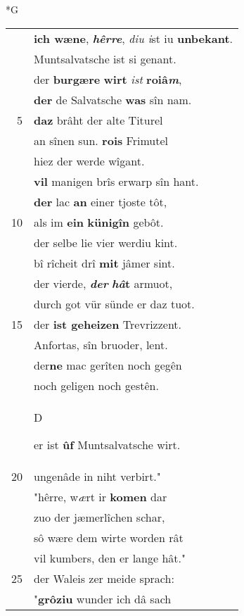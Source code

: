\documentclass[8pt,a4paper,notitlepage]{article}
\begin{document}
\newpage
\begin{table}[ht]
\begin{minipage}[t]{0.5\linewidth}
\small
\begin{center}*G
\end{center}
\begin{tabular}{rl}
 & \textbf{ich wæne}, \textit{\textbf{hêrre}}, \textit{diu i}st iu \textbf{unbekant}.\\ 
 & Muntsalvatsche ist si genant.\\ 
 & der \textbf{burgære} \textbf{wirt} \textit{ist} \textbf{roiâ\textit{m}},\\ 
 & \textbf{der} de Salvatsche \textbf{was} sîn nam.\\ 
5 & \textbf{daz} brâht der alte Titurel\\ 
 & an sînen sun. \textbf{rois} Frimutel\\ 
 & hiez der werde wîgant.\\ 
 & \textbf{vil} manigen brîs erwarp sîn hant.\\ 
 & \textbf{der} lac \textbf{an} einer tjoste tôt,\\ 
10 & als im \textbf{ein} \textbf{künigîn} gebôt.\\ 
 & der selbe lie vier werdiu kint.\\ 
 & bî rîcheit drî \textbf{mit} jâmer sint.\\ 
 & der vierde, \textit{\textbf{der}} \textbf{\textit{hâ}t} armuot,\\ 
 & durch got vür sünde er daz tuot.\\ 
15 & der \textbf{ist geheizen} Trevrizzent.\\ 
 & Anfortas, sîn bruoder, lent.\\ 
 & der\textbf{ne} mac gerîten noch gegên\\ 
 & noch geligen noch gestên.\\ 
 & \begin{large}D\end{large}er ist \textbf{ûf} Muntsalvatsche wirt.\\ 
20 & ungenâde in niht verbirt."\\ 
 & "hêrre, w\textit{æ}rt ir \textbf{komen} dar\\ 
 & zuo der jæmerlîchen schar,\\ 
 & sô wære dem wirte worden rât\\ 
 & vil kumbers, den er lange hât."\\ 
25 & der Waleis zer meide sprach:\\ 
 & "\textbf{grôziu} wunder ich dâ sach\\ 

\end{tabular}
\end{minipage}
\end{table}
\end{document}
